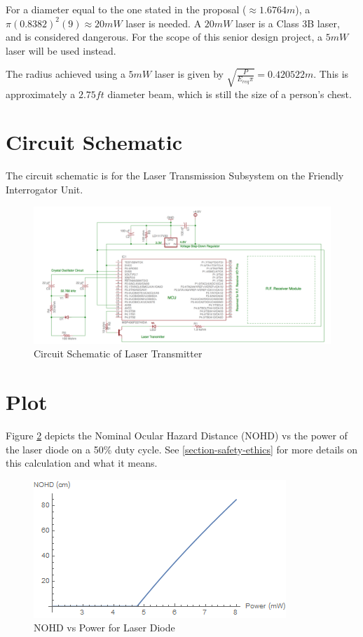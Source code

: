 \documentclass[letterpaper,10pt]{article}
\begin{document}
\begin{spacing}{1.15}
For a diameter equal to the one stated in the proposal ($\approx 1.6764 m$), a $\pi (0.8382)^2(9) \approx 20 mW$ laser is needed. A $20 mW$ laser is a Class 3B laser, and is considered dangerous. For the scope of this senior design project, a $5mW$ laser will be used instead. 

The radius achieved using a $5 mW$ laser is given by $\sqrt{\frac{P}{E_{req} \pi}} = 0.420522 m$. This is approximately a $2.75 ft$ diameter beam, which is still the size of a person's chest. 


\section{Circuit Schematic}
The circuit schematic is for the Laser Transmission Subsystem on the Friendly Interrogator Unit.
\begin{figure} [H]
	\centering
	\includegraphics[scale=0.38]{Circuit_Schematic.png}
	\caption{Circuit Schematic of Laser Transmitter\label{fig:circuit-schematic}}
\end{figure}

\section{Plot}
Figure \ref{fig:nohdplot} depicts the Nominal Ocular Hazard Distance (NOHD) vs the power of the laser diode on a 50\% duty cycle. See \ref{section-safety-ethics} for more details on this calculation and what it means. 
\begin{figure} [H]
	\centering
	\includegraphics[scale=0.70]{NOHDvsPower.png}
	\caption{NOHD vs Power for Laser Diode\label{fig:nohdplot}}
\end{figure}


\end{spacing}
\end{document}
